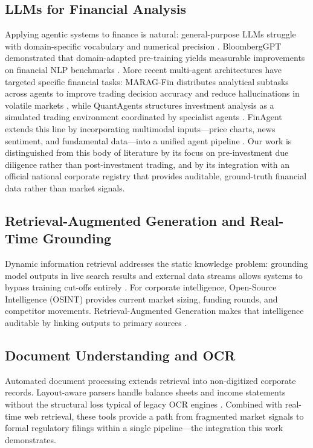 \documentclass[12pt]{article}
\begin{document}
\subsection{LLMs for Financial Analysis}

Applying agentic systems to finance is natural: general-purpose LLMs struggle with domain-specific
vocabulary and numerical precision \parencite{yang2023fingpt}. BloombergGPT demonstrated that
domain-adapted pre-training yields measurable improvements on financial NLP benchmarks
\parencite{wu2023bloomberggpt}. More recent multi-agent architectures have targeted specific
financial tasks: MARAG-Fin distributes analytical subtasks across agents to improve trading
decision accuracy and reduce hallucinations in volatile markets \parencite{maragfin2025}, while
QuantAgents structures investment analysis as a simulated trading environment coordinated by
specialist agents \parencite{li2025quantagents}. FinAgent extends this line by incorporating
multimodal inputs---price charts, news sentiment, and fundamental data---into a unified agent
pipeline \parencite{zhang2024finagent}. Our work is distinguished from this body of literature by
its focus on pre-investment due diligence rather than post-investment trading, and by its
integration with an official national corporate registry that provides auditable, ground-truth
financial data rather than market signals.

\subsection{Retrieval-Augmented Generation and Real-Time Grounding}

Dynamic information retrieval addresses the static knowledge problem: grounding model outputs in
live search results and external data streams allows systems to bypass training cut-offs entirely
\parencite{lewis2020retrieval}. For corporate intelligence, Open-Source Intelligence (OSINT)
provides current market sizing, funding rounds, and competitor movements.
Retrieval-Augmented Generation makes that intelligence auditable by linking outputs to primary
sources \parencite{gao2023retrieval}.

\subsection{Document Understanding and OCR}

Automated document processing extends retrieval into non-digitized corporate records.
Layout-aware parsers handle balance sheets and income statements without the structural loss
typical of legacy OCR engines \parencite{paruchuri2025marker}. Combined with real-time web
retrieval, these tools provide a path from fragmented market signals to formal regulatory filings
within a single pipeline---the integration this work demonstrates.
\end{document}

